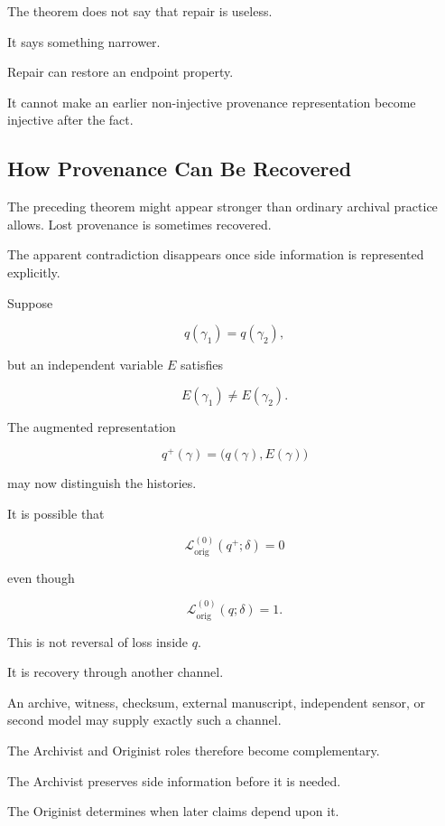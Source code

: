 \documentclass[
  11pt,
  a4paper,
  DIV=12,
  BCOR=0mm,
  parskip=half-
]{scrartcl}
\newcommand{\lossorig}{%
  \mathscr L_{\mathrm{orig}}%
}
\theoremstyle{definition}
\theoremstyle{plain}
\theoremstyle{remark}
\begin{document}
The theorem does not say that repair is useless.

It says something narrower.

Repair can restore an endpoint property.

It cannot make an earlier non-injective provenance representation become
injective after the fact.


\subsection{How Provenance Can Be Recovered}
\label{app:side-information}

The preceding theorem might appear stronger than ordinary archival practice
allows. Lost provenance is sometimes recovered.

The apparent contradiction disappears once side information is represented
explicitly.

Suppose

\[
  q(\gamma_1)=q(\gamma_2),
\]

but an independent variable \(E\) satisfies

\[
  E(\gamma_1)\neq E(\gamma_2).
\]

The augmented representation

\[
  q^+(\gamma)
  =
  \bigl(q(\gamma),E(\gamma)\bigr)
\]

may now distinguish the histories.

It is possible that

\[
  \lossorig^{(0)}(q^+;\delta)=0
\]

even though

\[
  \lossorig^{(0)}(q;\delta)=1.
\]

This is not reversal of loss inside \(q\).

It is recovery through another channel.

An archive, witness, checksum, external manuscript, independent sensor, or
second model may supply exactly such a channel.

The Archivist and Originist roles therefore become complementary.

The Archivist preserves side information before it is needed.

The Originist determines when later claims depend upon it.
\end{document}

